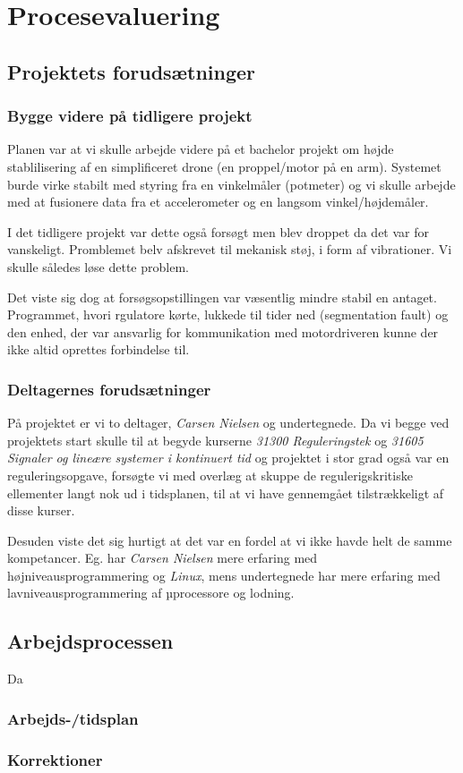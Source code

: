 


\section{Procesevaluering}
\subsection{Projektets forudsætninger}
\subsubsection{Bygge videre på tidligere projekt}
Planen var at vi skulle arbejde videre på et bachelor projekt om højde
stablilisering af en simplificeret drone (en proppel/motor på en arm).
Systemet burde virke stabilt med styring fra en vinkelmåler
(potmeter) og vi skulle arbejde med at fusionere data fra et accelerometer og en
langsom vinkel/højdemåler.

I det tidligere projekt var dette også forsøgt men blev droppet da det var for
vanskeligt. Promblemet belv afskrevet til mekanisk støj, i form af vibrationer.
Vi skulle således løse dette problem.

Det viste sig dog at forsøgsopstillingen var væsentlig mindre stabil en antaget.
Programmet, hvori rgulatore kørte, lukkede til tider ned (segmentation fault) og
den enhed, der var ansvarlig for kommunikation med motordriveren kunne der ikke
altid oprettes forbindelse til.

\subsubsection{Deltagernes forudsætninger}
På projektet er vi to deltager, \emph{Carsen Nielsen} og undertegnede.
Da vi begge ved projektets start skulle til at begyde kurserne \emph{31300
Reguleringstek} og \emph{31605 Signaler og lineære systemer i kontinuert tid}
og projektet i stor grad også var en reguleringsopgave, forsøgte vi med overlæg at
skuppe de regulerigskritiske ellementer langt nok ud i tidsplanen, til at vi
have gennemgået tilstrækkeligt af disse kurser.

Desuden viste det sig hurtigt at det var en fordel at vi ikke havde helt de
samme kompetancer. Eg. har \emph{Carsen Nielsen} mere erfaring med
højniveausprogrammering og \emph{Linux}, mens undertegnede har mere erfaring med
lavniveausprogrammering af µprocessore og lodning.

\subsection{Arbejdsprocessen}
Da 
\subsubsection{Arbejds-/tidsplan}
\subsubsection{Korrektioner}



